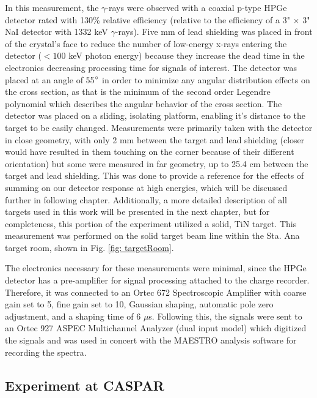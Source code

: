 In this measurement, the $\gamma$-rays were observed with a coaxial p-type HPGe detector rated with 130\% relative efficiency (relative to the efficiency of a 3" $\times$ 3" NaI detector with 1332 keV $\gamma$-rays). Five mm of lead shielding was placed in front of the crystal's face to reduce the number of low-energy x-rays entering the detector ($<100$ keV photon energy) because they increase the dead time in the electronics decreasing processing time for signals of interest. The detector was placed at an angle of 55$\degree$ in order to minimize any angular distribution effects on the cross section, as that is the minimum of the second order Legendre polynomial which describes the angular behavior of the cross section. The detector was placed on a sliding, isolating platform, enabling it's distance to the target to be easily changed. Measurements were primarily taken with the detector in close geometry, with only 2 mm between the target and lead shielding (closer would have resulted in them touching on the corner because of their different orientation) but some were measured in far geometry, up to 25.4 cm between the target and lead shielding. This was done to provide a reference for the effects of summing on our detector response at high energies, which will be discussed further in following chapter. Additionally, a more detailed description of all targets used in this work will be presented in the next chapter, but for completeness, this portion of the experiment utilized a solid, TiN target. This measurement was performed on the solid target beam line within the Sta. Ana target room, shown in Fig. \ref{fig: targetRoom}.


The electronics necessary for these measurements were minimal, since the HPGe detector has a pre-amplifier for signal processing attached to the charge recorder. Therefore, it was connected to an Ortec 672 Spectroscopic Amplifier with coarse gain set to 5, fine gain set to 10, Gaussian shaping, automatic pole zero adjustment, and a shaping time of 6 $\mu$s. Following this, the signals were sent to an Ortec 927 ASPEC Multichannel Analyzer (dual input model) which digitized the signals and was used in concert with the MAESTRO analysis software for recording the spectra. 



\subsection{Experiment at CASPAR}
\label{sec: caspar}

